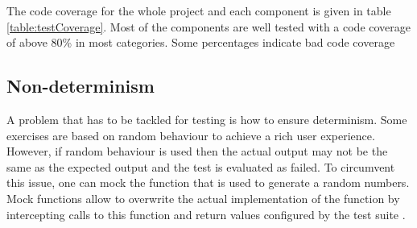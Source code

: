 The code coverage for the whole project and each component is given in table \ref{table:testCoverage}. Most of the components are well tested with a code coverage of above 80\% in most categories. Some percentages indicate bad code coverage 
 
\subsection*{Non-determinism}
A problem that has to be tackled for testing is how to ensure determinism. Some exercises are based on random behaviour to achieve a rich user experience. However, if random behaviour is used then the actual output may not be the same as the expected output and the test is evaluated as failed. To circumvent this issue, one can mock the function that is used to generate a random numbers. Mock functions allow to overwrite the actual implementation of the function by intercepting calls to this function and return values configured by the test suite \cite{Jest}. 

